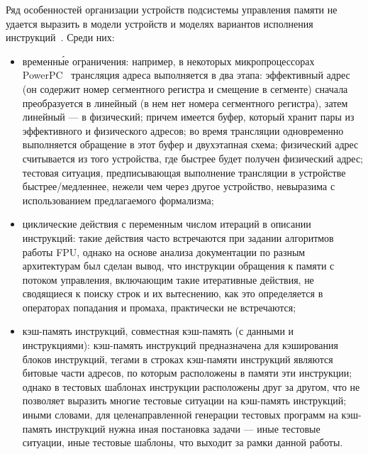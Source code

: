 Ряд особенностей организации устройств подсистемы управления памяти не удается выразить в модели устройств и моделях вариантов исполнения инструкций~\cite{my_ewdts_2009}. Среди них:
\begin{itemize}
    \item временн\'{ы}е ограничения: например, в некоторых микропроцессорах\\ PowerPC~\cite{PowerPC} трансляция адреса выполняется в два этапа: эффективный адрес (он содержит номер сегментного регистра и смещение в сегменте) сначала преобразуется в линейный (в нем нет номера сегментного регистра), затем линейный --- в физический; причем имеется буфер, который хранит пары из эффективного и физического адресов; во время трансляции одновременно выполняется обращение в этот буфер и двухэтапная схема; физический адрес считывается из того устройства, где быстрее будет получен физический адрес; тестовая ситуация, предписывающая выполнение трансляции в устройстве быстрее/медленнее, нежели чем через другое устройство, невыразима с использованием предлагаемого формализма;
    \item циклические действия с переменным числом итераций в описании инструкций: такие действия часто встречаются при задании алгоритмов работы FPU, однако на основе анализа документации по разным архитектурам был сделан вывод, что инструкции обращения к памяти с потоком управления, включающим такие итеративные действия, не сводящиеся к поиску строк и их вытеснению, как это определяется в операторах попадания и промаха, практически не встречаются;
    \item кэш-память инструкций, совместная кэш-память (с данными и инструкциями): кэш-память инструкций предназначена для кэширования блоков инструкций, тегами в строках кэш-памяти инструкций являются битовые части адресов, по которым расположены в памяти эти инструкции; однако в тестовых шаблонах инструкции расположены друг за другом, что не позволяет выразить многие тестовые ситуации на кэш-память инструкций; иными словами, для целенаправленной генерации тестовых программ на кэш-память инструкций нужна иная постановка задачи --- иные тестовые ситуации, иные тестовые шаблоны, что выходит за рамки данной работы.
\end{itemize}





